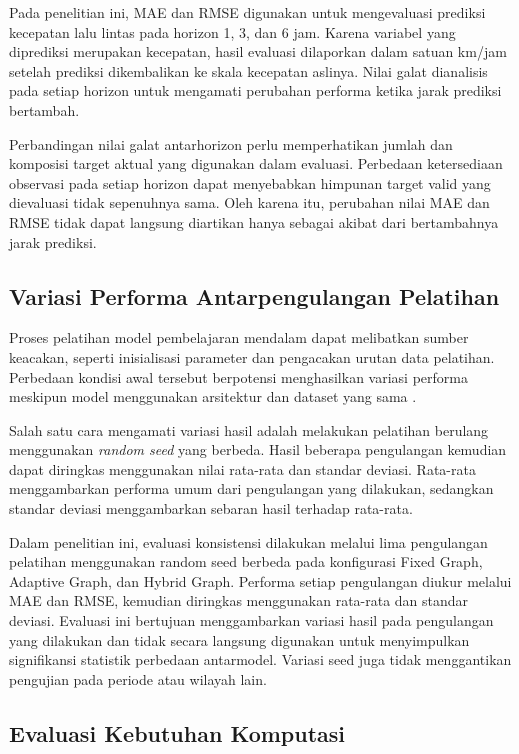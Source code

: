 Pada penelitian ini, MAE dan RMSE digunakan untuk mengevaluasi prediksi kecepatan lalu lintas pada horizon 1, 3, dan 6 jam. Karena variabel yang diprediksi merupakan kecepatan, hasil evaluasi dilaporkan dalam satuan km/jam setelah prediksi dikembalikan ke skala kecepatan aslinya. Nilai galat dianalisis pada setiap horizon untuk mengamati perubahan performa ketika jarak prediksi bertambah.

Perbandingan nilai galat antarhorizon perlu memperhatikan jumlah dan komposisi target aktual yang digunakan dalam evaluasi. Perbedaan ketersediaan observasi pada setiap horizon dapat menyebabkan himpunan target valid yang dievaluasi tidak sepenuhnya sama. Oleh karena itu, perubahan nilai MAE dan RMSE tidak dapat langsung diartikan hanya sebagai akibat dari bertambahnya jarak prediksi.

\subsection{Variasi Performa Antarpengulangan Pelatihan}
\label{subsec:random_seed}

Proses pelatihan model pembelajaran mendalam dapat melibatkan sumber keacakan, seperti inisialisasi parameter dan pengacakan urutan data pelatihan. Perbedaan kondisi awal tersebut berpotensi menghasilkan variasi performa meskipun model menggunakan arsitektur dan dataset yang sama \cite{bouthillier2021accounting}.

Salah satu cara mengamati variasi hasil adalah melakukan pelatihan berulang menggunakan \textit{random seed} yang berbeda. Hasil beberapa pengulangan kemudian dapat diringkas menggunakan nilai rata-rata dan standar deviasi. Rata-rata menggambarkan performa umum dari pengulangan yang dilakukan, sedangkan standar deviasi menggambarkan sebaran hasil terhadap rata-rata.

Dalam penelitian ini, evaluasi konsistensi dilakukan melalui lima pengulangan pelatihan menggunakan random seed berbeda pada konfigurasi Fixed Graph, Adaptive Graph, dan Hybrid Graph. Performa setiap pengulangan diukur melalui MAE dan RMSE, kemudian diringkas menggunakan rata-rata dan standar deviasi. Evaluasi ini bertujuan menggambarkan variasi hasil pada pengulangan yang dilakukan dan tidak secara langsung digunakan untuk menyimpulkan signifikansi statistik perbedaan antarmodel. Variasi seed juga tidak menggantikan pengujian pada periode atau wilayah lain.

\subsection{Evaluasi Kebutuhan Komputasi}
\label{subsec:karakteristik_komputasional}


